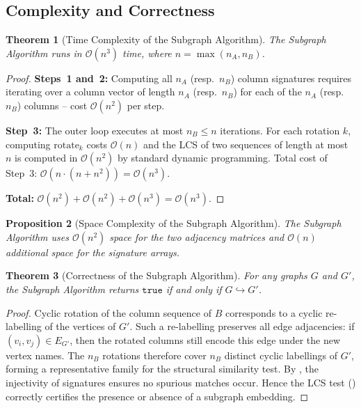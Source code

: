 ﻿\documentclass[12pt,a4paper]{article}
\theoremstyle{plain}
\newtheorem{theorem}{Theorem}[section]
\newtheorem{proposition}[theorem]{Proposition}
\theoremstyle{definition}
\theoremstyle{remark}
\begin{document}
	\subsection{Complexity and Correctness}

	\begin{theorem}[Time Complexity of the Subgraph Algorithm]
		\label{thm:subgraph_complexity}
		The Subgraph Algorithm runs in $\mathcal{O}(n^3)$ time, where
		$n = \max(n_A, n_B)$.
	\end{theorem}

	\begin{proof}
		\textbf{Steps~1 and~2:} Computing all $n_A$ (resp.\ $n_B$) column
		signatures requires iterating over a column vector of length $n_A$
		(resp.\ $n_B$) for each of the $n_A$ (resp.\ $n_B$) columns -- cost
		$\mathcal{O}(n^2)$ per step.

		\textbf{Step~3:} The outer loop executes at most $n_B \leq n$
		iterations.  For each rotation $k$, computing
		$\mathrm{rotate}_k$ costs $\mathcal{O}(n)$ and the LCS of two sequences
		of length at most $n$ is computed in $\mathcal{O}(n^2)$ by standard
		dynamic programming.  Total cost of Step~3:
		$\mathcal{O}(n \cdot (n + n^2)) = \mathcal{O}(n^3)$.

		\textbf{Total:}
		$\mathcal{O}(n^2) + \mathcal{O}(n^2) + \mathcal{O}(n^3)
		= \mathcal{O}(n^3)$.
	\end{proof}

	\begin{proposition}[Space Complexity of the Subgraph Algorithm]
		\label{prop:subgraph_space}
		The Subgraph Algorithm uses $\mathcal{O}(n^2)$ space for the two
		adjacency matrices and $\mathcal{O}(n)$ additional space for the
		signature arrays.
	\end{proposition}

	\begin{theorem}[Correctness of the Subgraph Algorithm]
		\label{thm:subgraph_correct}
		For any graphs $G$ and $G'$, the Subgraph Algorithm returns
		$\mathtt{true}$ if and only if $G \hookrightarrow G'$.
	\end{theorem}

	\begin{proof}
		Cyclic rotation of the column sequence of $B$ corresponds to a cyclic
		re-labelling of the vertices of $G'$.  Such a re-labelling preserves all
		edge adjacencies: if $(v_i, v_j) \in E_{G'}$, then the rotated columns
		still encode this edge under the new vertex names.  The $n_B$ rotations
		therefore cover $n_B$ distinct cyclic labellings of $G'$, forming a
		representative family for the structural similarity test.  By
		, the injectivity of signatures ensures no spurious
		matches occur.  Hence the LCS test ()
		correctly certifies the presence or absence of a subgraph embedding.
	\end{proof}
\end{document}
